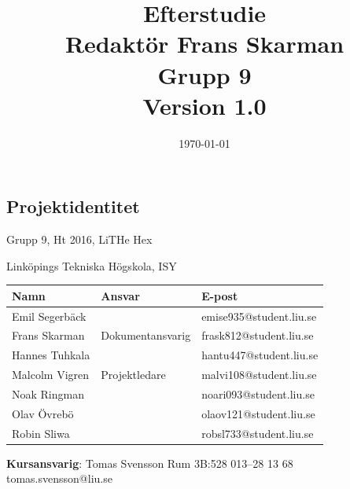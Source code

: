 \documentclass[a4paper,titlepage,12pt]{article}
\begin{document}
	\title{\LARGE
		\textbf{Efterstudie} \\
		\vspace*{0.5\baselineskip}
		\large
		Redaktör Frans Skarman\\
		Grupp 9 \\
		\small
		\vspace*{0.5\baselineskip}
		Version 1.0}
	
	\date{\today}
	
	\maketitle
	
	\newpage
	
	\begin{center}
		
		
		\section*{Projektidentitet}
		Grupp 9, Ht 2016, LiTHe Hex
		
		Linköpings Tekniska Högskola, ISY
		
		\renewcommand*{\arraystretch}{1.4}
		\begin{longtable}[c]{ l l l }
			\textbf{Namn} & \textbf{Ansvar} & \textbf{E-post} \\ \midrule
			Emil Segerbäck & & emise935@student.liu.se \\ \midrule
			Frans Skarman & Dokumentansvarig & frask812@student.liu.se \\ \midrule
			Hannes Tuhkala & & hantu447@student.liu.se \\ \midrule
			Malcolm Vigren & Projektledare & malvi108@student.liu.se \\ \midrule
			Noak Ringman &  & noari093@student.liu.se \\ \midrule
			Olav Övrebö &  & olaov121@student.liu.se \\ \midrule
			Robin Sliwa &  & robsl733@student.liu.se \\
		\end{longtable}
		
		\centering
		\textbf{Kursansvarig}: Tomas Svensson Rum 3B:528 013--28 13 68 tomas.svensson@liu.se
		
		\newpage
		\tableofcontents
		\newpage
		

\end{center}
\end{document}
